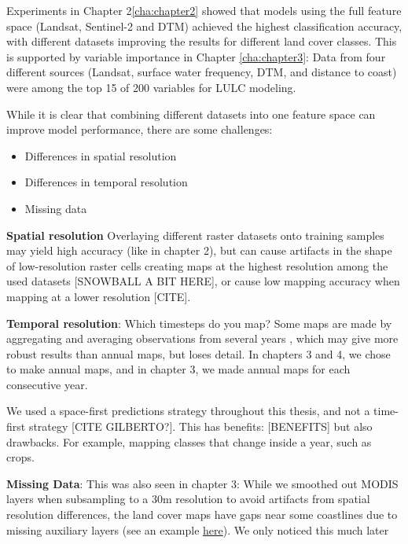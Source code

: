         Experiments in Chapter 2\ref{cha:chapter2} showed that models using the full feature space (Landsat, Sentinel-2 and DTM) achieved the highest classification accuracy, with different datasets improving the results for different land cover classes. This is supported by variable importance in Chapter \ref{cha:chapter3}: Data from four different sources (Landsat, surface water frequency, DTM, and distance to coast) were among the top 15 of 200 variables for LULC modeling.
        
        While it is clear that combining different datasets into one feature space can improve model performance, there are some challenges:
        \begin{itemize}
        \item Differences in spatial resolution
        \item Differences in temporal resolution
        \item Missing data
        \end{itemize}

        \textbf{Spatial resolution}
        Overlaying different raster datasets onto training samples may yield high accuracy (like in chapter 2), but can cause artifacts in the shape of low-resolution raster cells creating maps at the highest resolution among the used datasets \citep{moller2019oblique} [SNOWBALL A BIT HERE], or cause low mapping accuracy when mapping at a lower resolution [CITE]. 
        
        \textbf{Temporal resolution}:   
        Which timesteps do you map? Some maps are made by aggregating and averaging observations from several years \citep{pflugmacher2019mapping,esa2023cci}, which may give more robust results than annual maps, but loses detail. In chapters 3 and 4, we chose to make annual maps, and in chapter 3, we made annual maps for each consecutive year. 
    
        We used a space-first predictions strategy throughout this thesis, and not a time-first strategy [CITE GILBERTO?]. This has benefits: [BENEFITS] but also drawbacks. For example, mapping classes that change inside a year, such as crops.
        
        \textbf{Missing Data}:
        This was also seen in chapter 3: While we smoothed out MODIS layers when subsampling to a 30m resolution to avoid artifacts from spatial resolution differences, the land cover maps have gaps near some coastlines due to missing auxiliary layers (see an example \href{https://ecodatacube.eu/?base=OpenStreetMap%20(grayscale)&layer=Land%20Cover%20&zoom=13.2&eye=5000000&center=52.4582,5.3267&opacity=100&time=2019}{here}). We only noticed this much later
    
